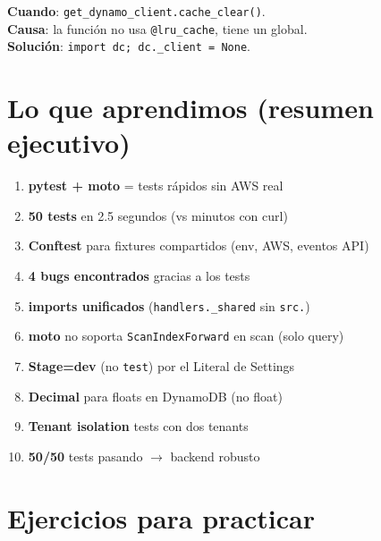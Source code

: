 \documentclass[11pt,a4paper,oneside]{article}
\begin{document}
\begin{tcolorbox}[colback=errred!5!white,colframe=errred,breakable,title={Error 5: 'function' has no attribute 'cache\_clear'}]
\textbf{Cuando}: \texttt{get\_dynamo\_client.cache\_clear()}. \\
\textbf{Causa}: la funci\'on no usa \texttt{@lru\_cache}, tiene un global. \\
\textbf{Soluci\'on}: \texttt{import dc; dc.\_client = None}.
\end{tcolorbox}

\section{Lo que aprendimos (resumen ejecutivo)}

\begin{tcolorbox}[colback=okgreen!5!white,colframe=okgreen,title={\textbf{Checklist Fase 6}}]
\begin{enumerate}
  \item \textbf{pytest + moto} = tests r\'apidos sin AWS real
  \item \textbf{50 tests} en 2.5 segundos (vs minutos con curl)
  \item \textbf{Conftest} para fixtures compartidos (env, AWS, eventos API)
  \item \textbf{4 bugs encontrados} gracias a los tests
  \item \textbf{imports unificados} (\texttt{handlers.\_shared} sin \texttt{src.})
  \item \textbf{moto} no soporta \texttt{ScanIndexForward} en scan (solo query)
  \item \textbf{Stage=dev} (no \texttt{test}) por el Literal de Settings
  \item \textbf{Decimal} para floats en DynamoDB (no float)
  \item \textbf{Tenant isolation} tests con dos tenants
  \item \textbf{50/50} tests pasando $\rightarrow$ backend robusto
\end{enumerate}
\end{tcolorbox}

\section{Ejercicios para practicar}
\end{document}
